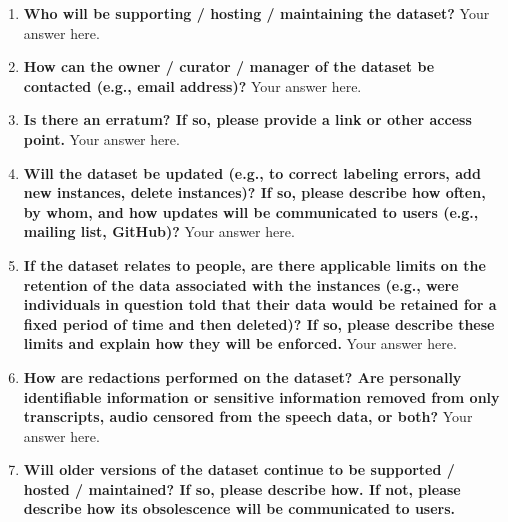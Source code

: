 \documentclass{article}
\begin{document}
    \noindent{}
    \begin{enumerate}[leftmargin=0.65cm]
        \scriptsize
        \item \textbf{Who will be supporting / hosting / maintaining the dataset?}
        \newline 
        Your answer here.
        \newline 
        \item \textbf{How can the owner / curator / manager of the dataset be contacted (e.g., email address)?}
        \newline 
        Your answer here.
        \newline 
        \item \textbf{Is there an erratum? If so, please provide a link or other access point.}
        \newline 
        Your answer here.
        \newline 
        \item \textbf{Will the dataset be updated (e.g., to correct labeling errors, add new instances, delete instances)? If so, please describe how often, by whom, and how updates will be communicated to users (e.g., mailing list, GitHub)?}
        \newline 
        Your answer here.
        \newline 
        \item \textbf{If the dataset relates to people, are there applicable limits on the retention of the data associated with the instances (e.g., were individuals in question told that their data would be retained for a fixed period of time and then deleted)? If so, please describe these limits and explain how they will be enforced.}
        \newline 
        Your answer here.
        \newline 
        \item \textbf{How are redactions performed on the dataset? Are personally identifiable information or sensitive information removed from only transcripts, audio censored from the speech data, or both?}
        \newline 
        Your answer here.
        \newline 
        \item \textbf{Will older versions of the dataset continue to be supported / hosted / maintained? If so, please describe how. If not, please describe how its obsolescence will be communicated to users.}

\end{enumerate}
\end{document}
